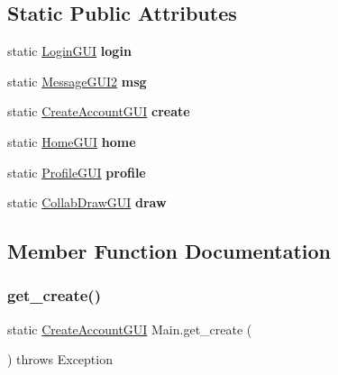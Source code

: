 \subsection*{Static Public Attributes}
\begin{DoxyCompactItemize}
\item 
\mbox{\label{class_main_a368d0eacb148dfeeeffc5d85bea45a9a}} 
static \hyperlink{class_login_g_u_i}{Login\+G\+UI} {\bfseries login}
\item 
\mbox{\label{class_main_af5bdcc4b883ce996098d27d6d189a1e3}} 
static \hyperlink{class_message_g_u_i2}{Message\+G\+U\+I2} {\bfseries msg}
\item 
\mbox{\label{class_main_ad83de0fbeb554341ca2f083b99df8318}} 
static \hyperlink{class_create_account_g_u_i}{Create\+Account\+G\+UI} {\bfseries create}
\item 
\mbox{\label{class_main_ad944c3306bc966c49dd370baaefd7ed2}} 
static \hyperlink{class_home_g_u_i}{Home\+G\+UI} {\bfseries home}
\item 
\mbox{\label{class_main_a7f8a2abcb8b79baf0bf1020a3322f37d}} 
static \hyperlink{class_profile_g_u_i}{Profile\+G\+UI} {\bfseries profile}
\item 
\mbox{\label{class_main_a26fc9b293a3101f877720090c1d966d0}} 
static \hyperlink{class_collab_draw_g_u_i}{Collab\+Draw\+G\+UI} {\bfseries draw}
\end{DoxyCompactItemize}


\subsection{Member Function Documentation}
\mbox{\label{class_main_a0d47d64d3fd1d384ca1e9327d614e700}} 
\subsubsection{\texorpdfstring{get\+\_\+create()}{get\_create()}}
{\footnotesize\ttfamily static \hyperlink{class_create_account_g_u_i}{Create\+Account\+G\+UI} Main.\+get\+\_\+create (\begin{DoxyParamCaption}{ }\end{DoxyParamCaption}) throws Exception\hspace{0.3cm}{\ttfamily [static]}}

